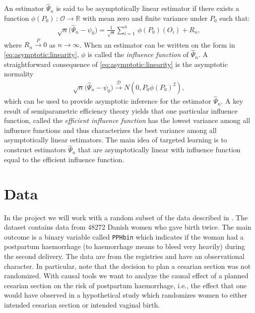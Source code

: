 \documentclass{article}
\newcommand{\R}{\mathbb{R}}
\newcommand{\1}{\mathbb{1}}
\begin{document}
An estimator \(\hat{\Psi}_n\) is said to be asymptotically linear
estimator if there exists a function
\(\phi(P_0) \, : \, \mathcal{O}\rightarrow \R\) with mean zero and
finite variance under \(P_0\) such that: 
\begin{align}
  \sqrt{n} \big( \hat{\Psi}_n - \psi_0 \big) =  \frac{1}{\sqrt{n}} \sum_{i=1}^n
  \, \phi(P_0) (O_i)  + R_n ,
  \label{eq:asymptotic:linearity}
\end{align}
where \(R_n \overset{P}{\rightarrow} 0\) as \(n\rightarrow\infty\).
When an estimator can be written on the form in
\eqref{eq:asymptotic:linearity}, \(\phi\) is called the
\textit{influence function} of \(\hat{\Psi}_n\). A straightforward
consequence of \eqref{eq:asymptotic:linearity} is the asymptotic
normality
\begin{align*}  
  \sqrt{n} \big( \hat{\Psi}_n - \psi_0 \big) \overset{\mathcal{D}}{\rightarrow} N(0, P_0 \phi(P_0)^2),
\end{align*} 
which can be used to provide asymptotic inference for the estimator
\(\hat{\Psi}_n\). A key result of semiparametric efficiency theory
\citep{bickel1993efficient} yields that one particular influence
function, called the \textit{efficient influence function} has the
lowest variance among all influence functions and thus characterizes
the best variance among all asymptotically linear estimators. The main
idea of targeted learning is to construct estimators \(\hat{\Psi}_n\)
that are asymptotically linear with influence function equal to the
efficient influence function. \fi





\section{Data}



In the project we will work with a random subset of the data described
in \cite{wikkelso2014prediction}. The dataset contains data from 48272
Danish women who gave birth twice. The main outcome is a binary
variable called \verb+PPHbin+ which indicates if the woman had a
postpartum haemorrhage (to haemorrhage means to bleed very heavily)
during the second delivery.
%
%
The data are from the registries and have an observational
character. In particular, note that the decision to plan a cesarian
section was not randomized. With causal tools we want to analyze the
causal effect of a planned cesarian section on the risk of postpartum
haemorrhage, i.e., the effect that one would have observed in a
hypothetical study which randomizes women to either intended cesarian
section or intended vaginal birth.
\end{document}
